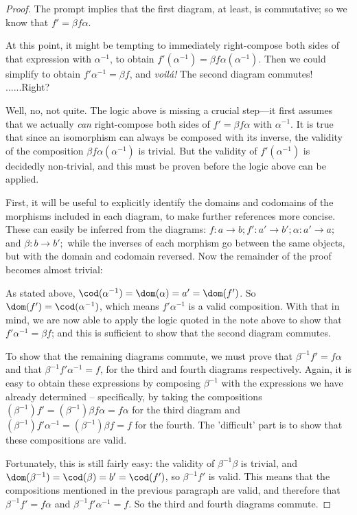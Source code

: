 \documentclass[main.tex]{subfiles}
\begin{document}
\begin{proof}
	The prompt implies that the first diagram, at least, is
	commutative; so we know that \(f' = \beta f \alpha \).

	At this point, it might be tempting to immediately right-compose both sides
	of that expression with \(\alpha^{-1}\), to obtain \(f'(\alpha^{-1}) = \beta
	f \alpha(\alpha^{-1})\). Then we could simplify to obtain \(f' \alpha^{-1} =
	\beta f\), and \textit{voil\'{a}!} The second diagram commutes! ......Right?

	Well, no, not quite. The logic above is missing a crucial step---it first
	assumes that we actually \textit{can} right-compose both sides of \(f' =
	\beta f \alpha \) with \(\alpha^{-1}\). It is true that since an isomorphism
	can always be composed with its inverse, the validity of the composition
	\(\beta f \alpha (\alpha^{-1})\) is trivial. But the validity of \(f'
	(\alpha^{-1})\) is decidedly non-trivial, and this must be proven before the
	logic above can be applied.

	First, it will be useful to explicitly identify the domains and codomains of the
	morphisms included in each diagram, to make further references more concise.
	These can easily be inferred from the diagrams: \(f \colon a \to b; f' \colon a'
	\to b'; \alpha \colon a' \to a;\) and \(\beta \colon b \to b';\) while the
	inverses of each morphism go between the same objects, but with the domain and
	codomain reversed. Now the remainder of the proof becomes almost trivial:

	As stated above, \(\cod(\alpha^{-1}) = \dom(\alpha) = a' = \dom (f')\). So
	\(\dom(f') = \cod(\alpha^{-1})\), which means \(f' \alpha^{-1}\) is a valid
	composition. With that in mind, we are now able to apply the logic quoted in the
	note above to show that \(f' \alpha^{-1} = \beta f\); and this is sufficient to
	show that the second diagram commutes.

	To show that the remaining diagrams commute, we must prove that \(\beta^{-1} f'
	= f \alpha\) and that \(\beta^{-1} f' \alpha^{-1} = f\), for the third and
	fourth diagrams respectively. Again, it is easy to obtain these expressions by
	composing \(\beta^{-1}\) with the expressions we have already determined --
	specifically, by taking the compositions \((\beta^{-1})f' = (\beta^{-1})\beta f
	\alpha = f \alpha\) for the third diagram and \((\beta^{-1})f' \alpha^{-1} =
	(\beta^{-1})\beta f = f\) for the fourth. The 'difficult' part is to show that
	these compositions are valid.

	Fortunately, this is still fairly easy: the validity of \(\beta^{-1} \beta\) is
	trivial, and \(\dom(\beta^{-1}) = \cod(\beta) = b' = \cod(f')\), so \(\beta^{-1}
	f'\) is valid. This means that the compositions mentioned in the previous
	paragraph are valid, and therefore that \(\beta^{-1} f' = f \alpha\) and
	\(\beta^{-1} f' \alpha^{-1} = f\). So the third and fourth diagrams commute.
\end{proof}
\end{document}
